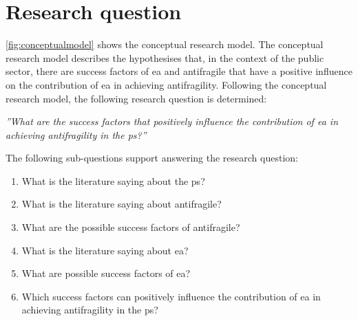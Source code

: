 \section{Research question}
\label{sec:introresearchquestion}
\cref{fig:conceptualmodel} shows the conceptual research model. The conceptual research model describes the hypothesises that, in the context of the public sector, there are success factors of \acrshort{ea} and \gls{antifragile} that have a positive influence on the contribution of \acrlong{ea} in achieving \gls{antifragility}. Following the conceptual research model, the following research question is determined:\bigskip

\noindent \emph{''What are the success factors that positively influence the contribution of \acrlong{ea} in achieving \gls{antifragility} in the \gls{ps}?''}\bigskip

\noindent The following sub-questions support answering the research question:

\begin{enumerate}
	\item{What is the literature saying about the \gls{ps}?}
	\item{What is the literature saying about \gls{antifragile}?}
	\item{What are the possible success factors of \gls{antifragile}?}
	\item{What is the literature saying about \acrlong{ea}?}
	\item{What are possible success factors of \acrlong{ea}?}
	\item{Which success factors can positively influence the contribution of \acrlong{ea} in achieving \gls{antifragility} in the \gls{ps}?}
\end{enumerate}
